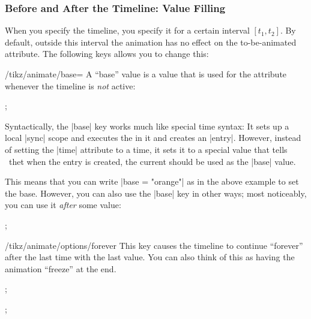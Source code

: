 \subsubsection{Before and After the Timeline: Value Filling}

When you specify the timeline, you specify it for a certain interval
$[t_1,t_2]$. By default, outside this interval the animation has no
effect on the to-be-animated attribute. The following keys allows you
to change this:

\begin{key}{/tikz/animate/base=}
  A ``base'' value is a value that is used for the attribute whenever
  the timeline is \emph{not} active:
\begin{codeexample}[animation list = {0.5,1,1.5,2,2.5}]
\tikz {};
\end{codeexample}

  Syntactically, the |base| key works much like special time syntax:
  It sets up a local |sync| scope and executes the  in
  it and creates an |entry|. However, instead of setting the |time|
  attribute to a time, it sets it to a special value that tells
  \tikzname\ thet when the entry is created, the current 
  should be used as the |base| value.

  This means that you can write |base = "orange"| as in the above
  example to set the base. However, you can also use the |base| key in
  other ways; most noticeably, you can use it \emph{after} some value:
\begin{codeexample}[animation list = {0.5,1,1.5,2,2.5}]
\tikz {};
\end{codeexample}
\end{key}

\begin{key}{/tikz/animate/options/forever}
  This key causes the timeline to continue ``forever'' after the last
  time with the last value. You can also think of this as having the
  animation ``freeze'' at the end.
\begin{codeexample}[animation list = {0.5,1,1.5,2,2.5}]
\tikz {};
\end{codeexample}
\begin{codeexample}[animation list = {0.5,1,1.5,2,2.5}]
\tikz {};
\end{codeexample}
\end{key}


